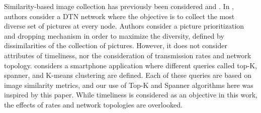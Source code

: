 Similarity-based image collection has previously been considered \cite{photonet} and \cite{mediascope}. In \cite{photonet}, authors consider a DTN network where the objective is to collect the most diverse set of pictures at every node.  Authors consider a picture prioritization and dropping mechanism in order to maximize the diversity, defined by dissimilarities of the collection of pictures. However, it does not consider attributes of timeliness, nor the consideration of transmission rates and network topology.  \cite{mediascope} considers a smartphone application where different queries called top-K, spanner, and K-means clustering are defined.  Each of these queries are based on image similarity metrics, and our use of Top-K and Spanner algorithms here was inspired by this paper.  While timeliness is considered as an objective in this work, the effects of rates and network topologies are overlooked.


